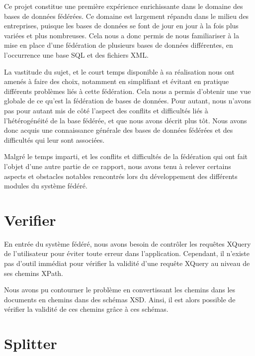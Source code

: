 Ce projet constitue une première expérience enrichissante dans le domaine des bases de données fédérées. Ce domaine est largement répandu dans le milieu des entreprises, puisque les bases de données se font de jour en jour à la fois plus variées et plus nombreuses. Cela nous a donc permis de nous familiariser à la mise en place d’une fédération de plusieurs bases de données différentes, en l’occurrence une base SQL et des fichiers XML.

La vastitude du sujet, et le court temps disponible à sa réalisation nous ont amenés à faire des choix, notamment en simplifiant et évitant en pratique différents problèmes liés à cette fédération. Cela nous a permis d’obtenir une vue globale de ce qu’est la fédération de bases de données. Pour autant, nous n’avons pas pour autant mis de côté l’aspect des conflits et difficultés liés à l’hétérogénéité de la base fédérée, et que nous avons décrit plus tôt. Nous avons donc acquis une connaissance générale des bases de données fédérées et des difficultés qui leur sont associées.

Malgré le temps imparti, et les conflits et difficultés de la fédération qui ont fait l’objet d’une autre partie de ce rapport, nous avons tenu à relever certains aspects et obstacles notables rencontrés lors du développement des différents modules du système fédéré.

\section{Verifier}

En entrée du système fédéré, nous avons besoin de contrôler les requêtes XQuery de l’utilisateur pour éviter toute erreur dans l’application. Cependant, il n’existe pas d’outil immédiat pour vérifier la validité d’une requête XQuery au niveau de ses chemins XPath.

Nous avons pu contourner le problème en convertissant les chemins dans les documents en chemins dans des schémas XSD. Ainsi, il est alors possible de vérifier la validité de ces chemins grâce à ces schémas.

\section{Splitter}

